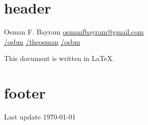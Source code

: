 \documentclass{article} %
\author{Osman Faruk Bayram}
\begin{document}
\section{header}
Osman F. Bayram \href{mailto://osmanfbayram@gmail.com}{osmanfbayram@gmail.com}\\

\href{http://github.com/osbm}{/osbm} \quad
{}\href{https://www.kaggle.com/theosman}{/theosman} \quad
{}\href{https://www.linkedin.com/in/osbm}{/osbm}



This document is written in \LaTeX.

\section{footer}

Last update \today
\end{document}
